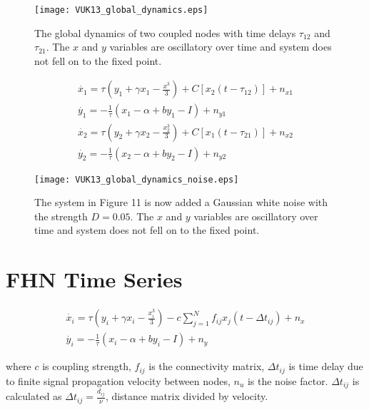 \documentclass[12pt]{article}
\begin{document}
\begin{figure}[h!]
	\centering
	\texttt{[image: VUK13\_global\_dynamics.eps]}
		\caption{The global dynamics of two coupled nodes with time delays $\tau_{12}$ and $\tau_{21}$. The $x$ and $y$ variables are oscillatory over time and system does not fell on to the fixed point.}
\end{figure}

\begin{subequations}
 \begin{align}\dot{x_1} = \tau (y_1 + \gamma x_1 - \frac{x^3}{3}) + C [x_2(t-\tau_{12})]  +n_{x1}\label{eqn: frobenius 17}\\  \dot{y_1} = -\frac{1}{\tau} (x_1 - \alpha + b y_1 - I ) +n_{y1} \label{eqn: frobenius 18} \\ \dot{x_2} = \tau (y_2 + \gamma x_2 - \frac{x_2^3}{3}) + C [x_1(t-\tau_{21})] +n_{x2} \label{eqn: frobenius 18} \\  \dot{y_2} = -\frac{1}{\tau} (x_2 - \alpha + b y_2 - I ) +n_{y2} \end{align} 
\end{subequations}

\begin{figure}[h!]
	\centering
	\texttt{[image: VUK13\_global\_dynamics\_noise.eps]}
		\caption{The system in Figure 11 is now added a Gaussian white noise with the strength $D=0.05$. The $x$ and $y$ variables are oscillatory over time and system does not fell on to the fixed point.}
\end{figure}

\section{FHN Time Series}

\begin{subequations}
 \begin{align}\dot{x_i} = \tau (y_i + \gamma x_i - \frac{x_i^3}{3}) -c \sum_{j=1}^N f_{ij}x_j(t - \Delta t_{ij}) +n_x \label{eqn: frobenius 17}\\  \dot{y_i} = -\frac{1}{\tau} (x_i - \alpha + b y_i - I ) +n_y \label{eqn: frobenius 18}   \end{align} 
\end{subequations}

where $c$ is coupling strength, $f_{ij}$ is the connectivity matrix, $\Delta t_{ij}$ is time delay due to finite signal propagation velocity between nodes, $n_u$ is the noise factor. $\Delta t_{ij}$ is calculated as $\Delta t_{ij}=\frac{d_{ij}}{\nu}$, distance matrix divided by velocity. 
\end{document}
